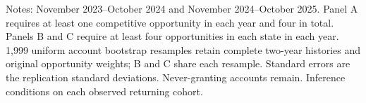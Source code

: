 \begin{table}[!htbp]
\begin{threeparttable}
\begin{tabular}{lrrrrr}
\bottomrule
\end{tabular}
\begin{tablenotes}[flushleft]
\scriptsize
\item Notes: November 2023--October 2024 and November 2024--October 2025. Panel A requires at least one competitive opportunity in each year and four in total. Panels B and C require at least four opportunities in each state in each year. 1,999 uniform account bootstrap resamples retain complete two-year histories and original opportunity weights; B and C share each resample. Standard errors are the replication standard deviations. Never-granting accounts remain. Inference conditions on each observed returning cohort.
\end{tablenotes}
\end{threeparttable}
\end{table}
